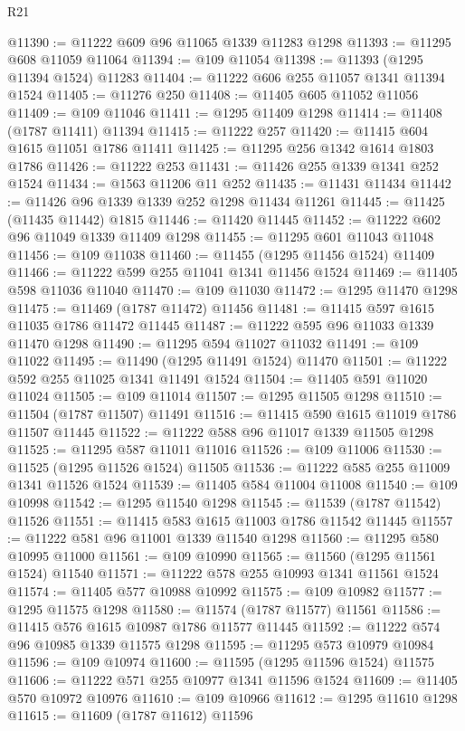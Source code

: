 \begin{lexlean}{R21}
\begin{coremodule}
@11390 := @11222 @609 @96 @11065 @1339 @11283 @1298
@11393 := @11295 @608 @11059 @11064
@11394 := @109 @11054
@11398 := @11393 (@1295 @11394 @1524) @11283
@11404 := @11222 @606 @255 @11057 @1341 @11394 @1524
@11405 := @11276 @250
@11408 := @11405 @605 @11052 @11056
@11409 := @109 @11046
@11411 := @1295 @11409 @1298
@11414 := @11408 (@1787 @11411) @11394
@11415 := @11222 @257
@11420 := @11415 @604 @1615 @11051 @1786 @11411
@11425 := @11295 @256 @1342 @1614 @1803 @1786
@11426 := @11222 @253
@11431 := @11426 @255 @1339 @1341 @252 @1524
@11434 := @1563 @11206 @11 @252
@11435 := @11431 @11434
@11442 := @11426 @96 @1339 @1339 @252 @1298 @11434 @11261
@11445 := @11425 (@11435 @11442) @1815
@11446 := @11420 @11445
@11452 := @11222 @602 @96 @11049 @1339 @11409 @1298
@11455 := @11295 @601 @11043 @11048
@11456 := @109 @11038
@11460 := @11455 (@1295 @11456 @1524) @11409
@11466 := @11222 @599 @255 @11041 @1341 @11456 @1524
@11469 := @11405 @598 @11036 @11040
@11470 := @109 @11030
@11472 := @1295 @11470 @1298
@11475 := @11469 (@1787 @11472) @11456
@11481 := @11415 @597 @1615 @11035 @1786 @11472 @11445
@11487 := @11222 @595 @96 @11033 @1339 @11470 @1298
@11490 := @11295 @594 @11027 @11032
@11491 := @109 @11022
@11495 := @11490 (@1295 @11491 @1524) @11470
@11501 := @11222 @592 @255 @11025 @1341 @11491 @1524
@11504 := @11405 @591 @11020 @11024
@11505 := @109 @11014
@11507 := @1295 @11505 @1298
@11510 := @11504 (@1787 @11507) @11491
@11516 := @11415 @590 @1615 @11019 @1786 @11507 @11445
@11522 := @11222 @588 @96 @11017 @1339 @11505 @1298
@11525 := @11295 @587 @11011 @11016
@11526 := @109 @11006
@11530 := @11525 (@1295 @11526 @1524) @11505
@11536 := @11222 @585 @255 @11009 @1341 @11526 @1524
@11539 := @11405 @584 @11004 @11008
@11540 := @109 @10998
@11542 := @1295 @11540 @1298
@11545 := @11539 (@1787 @11542) @11526
@11551 := @11415 @583 @1615 @11003 @1786 @11542 @11445
@11557 := @11222 @581 @96 @11001 @1339 @11540 @1298
@11560 := @11295 @580 @10995 @11000
@11561 := @109 @10990
@11565 := @11560 (@1295 @11561 @1524) @11540
@11571 := @11222 @578 @255 @10993 @1341 @11561 @1524
@11574 := @11405 @577 @10988 @10992
@11575 := @109 @10982
@11577 := @1295 @11575 @1298
@11580 := @11574 (@1787 @11577) @11561
@11586 := @11415 @576 @1615 @10987 @1786 @11577 @11445
@11592 := @11222 @574 @96 @10985 @1339 @11575 @1298
@11595 := @11295 @573 @10979 @10984
@11596 := @109 @10974
@11600 := @11595 (@1295 @11596 @1524) @11575
@11606 := @11222 @571 @255 @10977 @1341 @11596 @1524
@11609 := @11405 @570 @10972 @10976
@11610 := @109 @10966
@11612 := @1295 @11610 @1298
@11615 := @11609 (@1787 @11612) @11596

\end{coremodule}
\end{lexlean}
